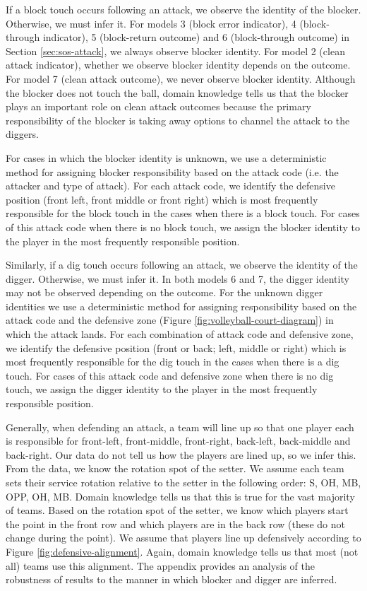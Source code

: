 \documentclass[USenglish]{article}
\theoremstyle{dgthm}
\theoremstyle{dgdef}
\begin{document}
If a block touch occurs following an attack, we observe the identity of the blocker. Otherwise, we must infer it. For models 3 (block error indicator), 4 (block-through indicator), 5 (block-return outcome) and 6 (block-through outcome) in Section \ref{sec:sos-attack}, we always observe blocker identity. For model 2 (clean attack indicator), whether we observe blocker identity depends on the outcome. For model 7 (clean attack outcome), we never observe blocker identity. Although the blocker does not touch the ball, domain knowledge tells us that the blocker plays an important role on clean attack outcomes because the primary responsibility of the blocker is taking away options to channel the attack to the diggers.

For cases in which the blocker identity is unknown, we use a deterministic method for assigning blocker responsibility based on the attack code (i.e. the attacker and type of attack). For each attack code, we identify the defensive position (front left, front middle or front right) which is most frequently responsible for the block touch in the cases when there is a block touch. For cases of this attack code when there is no block touch, we assign the blocker identity to the player in the most frequently responsible position.

Similarly, if a dig touch occurs following an attack, we observe the identity of the digger. Otherwise, we must infer it. In both models 6 and 7, the digger identity may not be observed depending on the outcome. For the unknown digger identities we use a deterministic method for assigning responsibility based on the attack code and the defensive zone (Figure \ref{fig:volleyball-court-diagram}) in which the attack lands. For each combination of attack code and defensive zone, we identify the defensive position (front or back; left, middle or right) which is most frequently responsible for the dig touch in the cases when there is a dig touch. For cases of this attack code and defensive zone when there is no dig touch, we assign the digger identity to the player in the most frequently responsible position.

Generally, when defending an attack, a team will line up so that one player each is responsible for front-left, front-middle, front-right, back-left, back-middle and back-right. Our data do not tell us how the players are lined up, so we infer this. From the data, we know the rotation spot of the setter. We assume each team sets their service rotation relative to the setter in the following order: S, OH, MB, OPP, OH, MB. Domain knowledge tells us that this is true for the vast majority of teams. Based on the rotation spot of the setter, we know which players start the point in the front row and which players are in the back row (these do not change during the point). We assume that players line up defensively according to Figure \ref{fig:defensive-alignment}. Again, domain knowledge tells us that most (not all) teams use this alignment. The appendix provides an analysis of the robustness of results to the manner in which blocker and digger are inferred.
\end{document}

